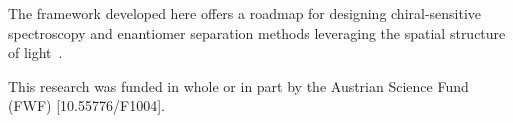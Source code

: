 \documentclass[reprint,aps,prl,twocolumn,superscriptaddress,groupedaddress]{revtex4-2}
\begin{document}
The framework developed here offers a roadmap for designing chiral-sensitive spectroscopy and enantiomer separation methods leveraging the spatial structure of light~\cite{Leibscher2022}.\\

\begin{acknowledgments}
This research was funded in whole or in part by the Austrian Science Fund (FWF) [10.55776/F1004].  
\end{acknowledgments}




\end{document}
